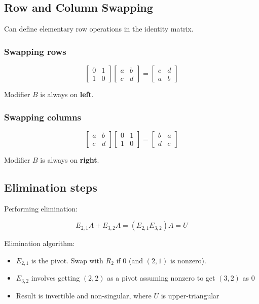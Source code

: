 \subsection{Row and Column Swapping}

Can define elementary row operations in the identity matrix.

\subsubsection{Swapping rows}

\[
    \begin{bmatrix}
        0&1\\
        1&0
    \end{bmatrix}
    \begin{bmatrix}
        a&b\\
        c&d
    \end{bmatrix}
    =
    \begin{bmatrix}
        c&d\\
        a&b
    \end{bmatrix}
\]

Modifier $B$ is always on \textbf{left}.

\subsubsection{Swapping columns}

\[
    \begin{bmatrix}
        a&b\\
        c&d
    \end{bmatrix}
    \begin{bmatrix}
        0&1\\
        1&0
    \end{bmatrix}
    =
    \begin{bmatrix}
        b&a\\
        d&c
    \end{bmatrix}
\]

Modifier $B$ is always on \textbf{right}.

\subsection{Elimination steps}

Performing elimination:

\[E_{2,1}A+E_{3,2}A=(E_{2,1}E_{3,2})A=U\]

Elimination algorithm:
\begin{itemize}
    \item $E_{2,1}$ is the pivot. Swap with $R_2$ if 0 (and $(2,1)$ is nonzero).
    \item $E_{3,2}$ involves getting $(2,2)$ as a pivot assuming nonzero to get $(3,2)$ as 0
    \item Result is invertible and non-singular, where $U$ is upper-triangular
\end{itemize}

